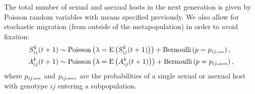 \documentclass{article}\usepackage[]{graphicx}\usepackage[]{color}
\begin{document}
The total number of sexual and asexual hosts in the next generation is given by Poisson random variables with means specified previously. We also allow for stochastic migration (from outside of the metapopulation) in order to avoid fixation:
\begin{equation}
\begin{aligned}
S_{ij}^k(t+1) &\sim \mathrm{Poisson}\left(\lambda=\mathrm{E}\left(S_{ij}^k(t+1)\right)\right) + \mathrm{Bernoulli}\left(p=p_{ij,\textrm{\tiny sex}}\right),\\
A_{ij}^k(t+1) &\sim \mathrm{Poisson}\left(\lambda=\mathrm{E}\left(A_{ij}^k(t+1)\right)\right) + \mathrm{Bernoulli}\left(p=p_{ij, \textrm{\tiny asex}}\right),
\end{aligned}
\end{equation}
where $p_{ij,\textrm{\tiny sex}}$ and $p_{ij, \textrm{\tiny asex}}$ are the probabilities of a single sexual or asexual host with genotype $ij$ entering a subpopulation.
\end{document}
